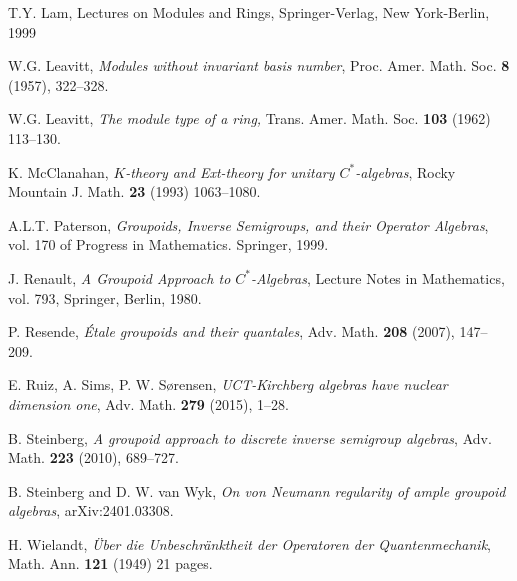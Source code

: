 \documentclass[a4paper, 11pt, reqno]{amsart}
\theoremstyle{definition}
\begin{document}
\begin{thebibliography}{}
T.Y. Lam, Lectures on Modules and Rings, Springer-Verlag, New York-Berlin, 1999


 W.G. Leavitt, {\it Modules without invariant basis number}, Proc. Amer. Math. Soc. {\bf 8} (1957), 322--328.

W.G.  Leavitt, {\it The module type of a ring,} Trans. Amer. Math. Soc. {\bf 103} (1962) 113--130. 




  K. McClanahan, \emph{$K$-theory and Ext-theory for unitary $C^*$-algebras}, Rocky Mountain J. Math. {\bf 23} (1993) 1063--1080.

 A.L.T. Paterson,  \textit{Groupoids, Inverse Semigroups, and their Operator Algebras}, vol. 170 of Progress in Mathematics. Springer, 1999.

J. Renault, {\it A Groupoid Approach to $C^*$-Algebras}, Lecture Notes in Mathematics, vol. 793, Springer, Berlin, 1980.
 
  P. Resende, {\it \'{E}tale groupoids and their quantales},  Adv. Math. \textbf{208} (2007), 147--209.

  E. Ruiz, A. Sims, P. W. S\o rensen, {\it UCT-Kirchberg algebras have nuclear dimension one},  Adv. Math. \textbf{279} (2015), 1--28.




B. Steinberg, {\it A groupoid approach to discrete inverse semigroup algebras}, Adv. Math. \textbf{223} (2010), 689--727.

B. Steinberg and D. W. van Wyk, {\it On von Neumann regularity of ample groupoid algebras}, 	arXiv:2401.03308.


 H. Wielandt, {\it \"Uber die Unbeschr\"anktheit der Operatoren der Quantenmechanik}, Math. Ann. {\bf 121} (1949) 21 pages. 


\end{thebibliography}
\end{document}
